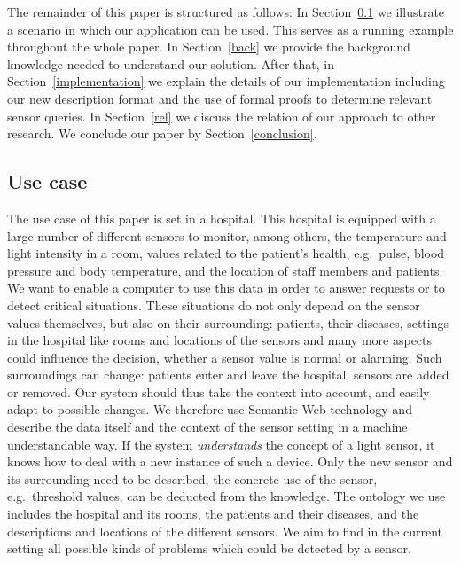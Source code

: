 The remainder of this paper is structured as follows: 
In Section~\ref{usecasenew} we illustrate a scenario in which our application can be used. This serves as a running example throughout the whole paper. 
In Section~\ref{back} we  
provide the background knowledge needed to understand our solution. 
After that, in Section~\ref{implementation} we explain the details of our implementation including our new description format and the use of
formal 
proofs to determine relevant sensor queries. 
In Section~\ref{rel} we discuss the relation of our approach to other research.
We conclude our paper by Section~\ref{conclusion}.

\subsection{Use case}\label{usecasenew}
The use case of this paper is set in a hospital.  This hospital is equipped with a large number of different sensors to monitor, among others, 
the temperature and light intensity in a room, 
 values related to the patient's health, 
e.g.\ pulse, blood pressure and body temperature, and the location of staff members and patients. 
We want to enable a computer to use this data in order to answer requests or to detect critical situations.
These situations do not only depend on the sensor values themselves, but also on their surrounding: 
patients, their diseases, settings in the hospital like rooms and locations of the sensors and many more aspects could influence the decision, whether a 
sensor value is normal or alarming.
Such surroundings can change: patients enter and leave the hospital, sensors are added or removed.
Our system should thus take the context into account, and easily adapt to possible changes.
We therefore use Semantic Web technology and 
  describe the data itself and 
the context of the sensor setting in a machine understandable way. If the system \emph{understands} the concept of a light sensor, 
it knows how to deal with a new instance of such a 
device. Only the new sensor and its surrounding need to be described, the concrete use of the sensor, e.g.\ threshold values, can be deducted from the knowledge.
%
The ontology we use includes the hospital and its rooms, 
the patients and their diseases, 
and the descriptions and locations of the different sensors. 
We aim to find in the current setting all possible kinds of problems which could be detected by a sensor. 

